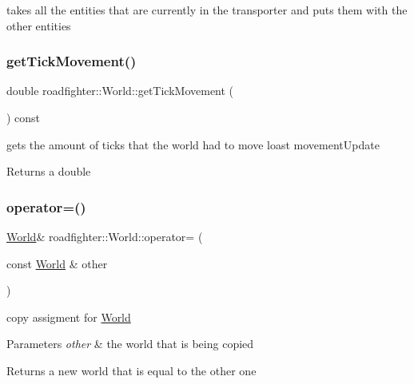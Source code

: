 takes all the entities that are currently in the transporter and puts them with the other entities \mbox{\label{classroadfighter_1_1World_a37fb93dcb90ec720a4ef17c43cf64dd4}} 
\subsubsection{\texorpdfstring{get\+Tick\+Movement()}{getTickMovement()}}
{\footnotesize\ttfamily double roadfighter\+::\+World\+::get\+Tick\+Movement (\begin{DoxyParamCaption}{ }\end{DoxyParamCaption}) const}

gets the amount of ticks that the world had to move loast movement\+Update \begin{DoxyReturn}{Returns}
a double 
\end{DoxyReturn}
\mbox{\label{classroadfighter_1_1World_a31482bef8cfc86abc6326a4ffca74872}} 
\subsubsection{\texorpdfstring{operator=()}{operator=()}\hspace{0.1cm}{\footnotesize\ttfamily [1/2]}}
{\footnotesize\ttfamily \hyperlink{classroadfighter_1_1World}{World}\& roadfighter\+::\+World\+::operator= (\begin{DoxyParamCaption}\item[{const \hyperlink{classroadfighter_1_1World}{World} \&}]{other }\end{DoxyParamCaption})\hspace{0.3cm}{\ttfamily [default]}}

copy assigment for \hyperlink{classroadfighter_1_1World}{World} 
\begin{DoxyParams}{Parameters}
{\em other} & the world that is being copied \\
\hline
\end{DoxyParams}
\begin{DoxyReturn}{Returns}
a new world that is equal to the other one 
\end{DoxyReturn}
\mbox{\label{classroadfighter_1_1World_ae2c0a8c3c8abd624087d5c5d82c2d5fd}} 
